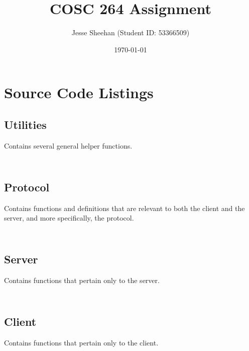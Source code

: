 \documentclass[11pt]{article} %
\title{COSC 264 Assignment}
\date{\today}
\author{Jesse Sheehan (Student ID: 53366509)}
\newcommand{\includecode}[1]{\begin{mdframed}\inputminted[linenos=true, breaklines]{c}{#1}\end{mdframed}}
\begin{document}
\begin{titlepage}

\maketitle

\hrulefill

\end{titlepage}



\section{Source Code Listings}

\subsection{Utilities}
Contains several general helper functions.
\includecode{../src/utils.h}
\includecode{../src/utils.c}

\newpage
\subsection{Protocol}
Contains functions and definitions that are relevant to both the client and the server, and more specifically, the protocol.
\includecode{../src/protocol.h}
\includecode{../src/protocol.c}

\newpage
\subsection{Server}
Contains functions that pertain only to the server.
\includecode{../src/server.h}
\includecode{../src/server.c}

\newpage
\subsection{Client}
Contains functions that pertain only to the client.
\includecode{../src/client.h}
\includecode{../src/client.c}
\end{document}
